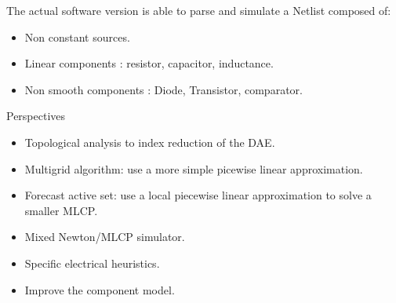 
\frame
{
\begin{block}{The actual software version is able to parse and simulate a Netlist composed of:}
\begin{itemize}
\item Non constant sources.
\item Linear components : resistor, capacitor, inductance.
\item Non smooth components : Diode, Transistor, comparator.
\end{itemize}
\end{block}
\pause
\begin{block}{Perspectives}
\begin{itemize}
\item Topological analysis to index reduction of the DAE.
\item Multigrid algorithm: use a more simple picewise linear approximation.
\item Forecast active set: use a local piecewise linear approximation to solve a smaller MLCP.
\item Mixed Newton/MLCP simulator.
\item Specific electrical heuristics.
\item Improve the component model.
\end{itemize}
\end{block}

}
